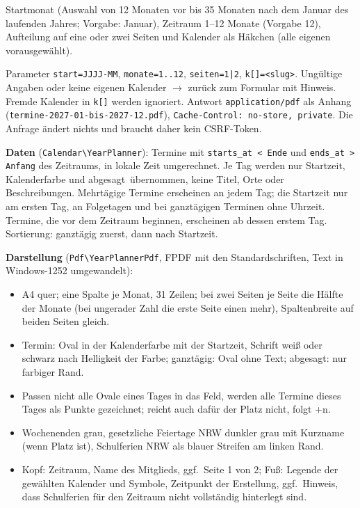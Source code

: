 \documentclass[a4paper,fontsize=10pt]{scrartcl}
\newcommand{\code}[1]{\texttt{#1}}
\begin{document}
\begin{description}[style=nextline, leftmargin=1.2cm]
  \item[Formular \code{GET /terminuebersicht}]
    Startmonat (Auswahl von 12 Monaten vor bis 35 Monaten nach dem Januar des
    laufenden Jahres; Vorgabe: Januar), Zeitraum 1--12 Monate (Vorgabe 12),
    Aufteilung auf eine oder zwei Seiten und Kalender als Häkchen (alle
    eigenen vorausgewählt).
  \item[Download \code{GET /terminuebersicht.pdf}]
    Parameter \code{start=JJJJ-MM}, \code{monate=1..12}, \code{seiten=1|2},
    \code{k[]=<slug>}. Ungültige Angaben oder keine eigenen Kalender
    $\rightarrow$ zurück zum Formular mit Hinweis. Fremde Kalender in
    \code{k[]} werden ignoriert. Antwort \code{application/pdf} als Anhang
    (\code{termine-2027-01-bis-2027-12.pdf}), \code{Cache-Control: no-store,
    private}. Die Anfrage ändert nichts und braucht daher kein CSRF-Token.
\end{description}

\textbf{Daten} (\code{Calendar\textbackslash YearPlanner}): Termine mit
\code{starts\_at < Ende} und \code{ends\_at > Anfang} des Zeitraums, in
lokale Zeit umgerechnet. Je Tag werden nur Startzeit, Kalenderfarbe und
\glqq abgesagt\grqq\ übernommen, keine Titel, Orte oder Beschreibungen.
Mehrtägige Termine erscheinen an jedem Tag; die Startzeit nur am ersten Tag,
an Folgetagen und bei ganztägigen Terminen ohne Uhrzeit. Termine, die vor dem
Zeitraum beginnen, erscheinen ab dessen erstem Tag. Sortierung: ganztägig
zuerst, dann nach Startzeit.

\textbf{Darstellung} (\code{Pdf\textbackslash YearPlannerPdf}, FPDF mit den
Standardschriften, Text in Windows-1252 umgewandelt):

\begin{itemize}
  \item A4 quer; eine Spalte je Monat, 31 Zeilen; bei zwei Seiten je Seite
        die Hälfte der Monate (bei ungerader Zahl die erste Seite einen mehr),
        Spaltenbreite auf beiden Seiten gleich.
  \item Termin: Oval in der Kalenderfarbe mit der Startzeit, Schrift weiß oder
        schwarz nach Helligkeit der Farbe; ganztägig: Oval ohne Text;
        abgesagt: nur farbiger Rand.
  \item Passen nicht alle Ovale eines Tages in das Feld, werden alle Termine
        dieses Tages als Punkte gezeichnet; reicht auch dafür der Platz nicht,
        folgt \glqq +n\grqq.
  \item Wochenenden grau, gesetzliche Feiertage NRW dunkler grau mit
        Kurzname (wenn Platz ist), Schulferien NRW als blauer Streifen am
        linken Rand.
  \item Kopf: Zeitraum, Name des Mitglieds, ggf.\ \glqq Seite 1 von 2\grqq;
        Fuß: Legende der gewählten Kalender und Symbole, Zeitpunkt der
        Erstellung, ggf.\ Hinweis, dass Schulferien für den Zeitraum nicht
        vollständig hinterlegt sind.
\end{itemize}
\end{document}
